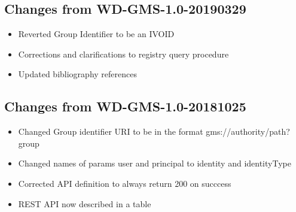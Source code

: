 \documentclass[11pt,a4paper]{ivoa}
\begin{document}
\subsection{Changes from WD-GMS-1.0-20190329}
\begin{itemize}
\item{Reverted Group Identifier to be an IVOID}
\item{Corrections and clarifications to registry query procedure}
\item{Updated bibliography references}
\end{itemize}

\subsection{Changes from WD-GMS-1.0-20181025}
\begin{itemize}
\item{Changed Group identifier URI to be in the format gms://authority/path?group}
\item{Changed names of params user and principal to identity and identityType}
\item{Corrected API definition to always return 200 on succcess}
\item{REST API now described in a table}
\end{itemize}



\end{document}
